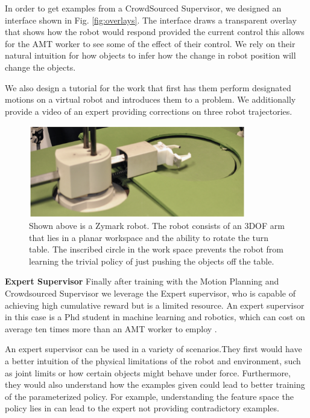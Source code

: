 \documentclass[10pt, conference]{ieeeconf}      %
\begin{document}
In order to get examples from a CrowdSourced Supervisor, we designed an interface shown in Fig. \ref{fig:overlays}. The interface draws a transparent overlay that shows how the robot would respond provided the current control this allows for the AMT worker to see some of the effect of their control. We rely on their natural intuition for how objects to infer how the change in robot position will change the objects.

We also design a tutorial for the work that first has them perform designated motions on a virtual robot and introduces them to a problem. We additionally provide a video of an expert providing corrections on three robot trajectories. 

\begin{figure}[t!]
\centering
\includegraphics[width=\columnwidth, height=4cm]{f_figs/robot.pdf}
\caption{ \footnotesize Shown above is a Zymark robot. The robot consists of an 3DOF arm that lies in a planar workspace and the ability to rotate the turn table. The inscribed circle in the work space prevents the robot from learning the trivial policy of just pushing the objects off the table.}
\vspace*{-10pt}
\label{fig:robot}
\end{figure}


\noindent \textbf{Expert Supervisor} Finally after training with the Motion Planning and Crowdsourced Supervisor we leverage the Expert supervisor, who is capable of achieving high cumulative reward but is a limited resource. An expert supervisor in this case is a Phd student in machine learning and robotics, which can cost on average ten times more than an AMT worker to employ \cite{}.

An expert supervisor can be used in a variety of scenarios.They first would have a better intuition of the physical limitations of the robot and environment, such as joint limits or how certain objects might behave under force. Furthermore, they would also understand how the examples given could lead to better training of the parameterized policy. For example, understanding the feature space the policy lies in can lead to the expert not providing contradictory examples. 
\end{document}
